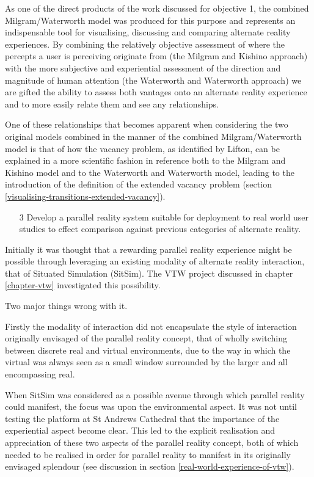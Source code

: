 As one of the direct products of the work discussed for objective 1, the combined Milgram/Waterworth model was produced for this purpose and represents an indispensable tool for visualising, discussing and comparing alternate reality experiences. By combining the relatively objective assessment of where the percepts a user is perceiving originate from (the Milgram and Kishino approach) with the more subjective and experiential assessment of the direction and magnitude of human attention (the Waterworth and Waterworth approach) we are gifted the ability to assess both vantages onto an alternate reality experience and to more easily relate them and see any relationships.

One of these relationships that becomes apparent when considering the two original models combined in the manner of the combined Milgram/Waterworth model is that of how the vacancy problem, as identified by Lifton, can be explained in a more scientific fashion in reference both to the Milgram and Kishino model and to the Waterworth and Waterworth model, leading to the introduction of the definition of the extended vacancy problem (section \ref{visualising-transitions-extended-vacancy}).

\begin{enumerate}
	\item[3] Develop a parallel reality system suitable for deployment to real world user studies to effect comparison against previous categories of alternate reality.
\end{enumerate}

Initially it was thought that a rewarding parallel reality experience might be possible through leveraging an existing modality of alternate reality interaction, that of Situated Simulation (SitSim). The VTW project discussed in chapter \ref{chapter-vtw} investigated this possibility.

Two major things wrong with it.

Firstly the modality of interaction did not encapsulate the style of interaction originally envisaged of the parallel reality concept, that of wholly switching between discrete real and virtual environments, due to the way in which the virtual was always seen as a small window surrounded by the larger and all encompassing real.

When SitSim was considered as a possible avenue through which parallel reality could manifest, the focus was upon the environmental aspect. It was not until testing the platform at St Andrews Cathedral that the importance of the experiential aspect become clear. This led to the explicit realisation and appreciation of these two aspects of the parallel reality concept, both of which needed to be realised in order for parallel reality to manifest in its originally envisaged splendour (see discussion in section \ref{real-world-experience-of-vtw}).

